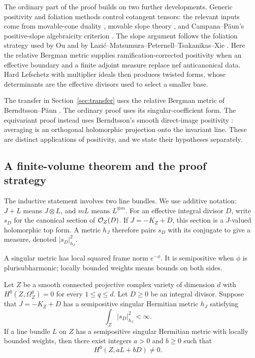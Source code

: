 The ordinary part of the proof builds on two further developments.
Generic positivity and foliation methods control cotangent tensors:
the relevant inputs come from movable-cone duality
\cite{BDPP2013}, movable slope theory \cite{GKP2016}, and
Campana--P\u aun's positive-slope algebraicity criterion
\cite[Theorem~1.1]{CampanaPaun2019}.
The slope argument follows the foliation strategy used by
Ou \cite[Theorem~1.4]{Ou2023} and by
Lazi\'c--Matsumura--Peternell--Tsakanikas--Xie
\cite[Theorem~4.1]{LMPTX2023}.
Here the relative Bergman metric supplies ramification-corrected
positivity when an effective boundary and a finite adjoint measure
replace nef anticanonical data.
Hard Lefschetz with multiplier ideals \cite[Theorem~2.1.1]{DPS2001}
then produces twisted forms, whose determinants are the effective
divisors used to select a smaller base.

The transfer in Section~\ref{sec:transfer} uses the relative Bergman metric of
Berndtsson--P\u aun \cite[Theorem~0.1]{BerndtssonPaun2008}.
The ordinary proof uses its singular-coefficient form. The equivariant
proof instead uses Berndtsson's smooth direct-image positivity
\cite[Theorem~1.2]{Berndtsson2009}: averaging is an orthogonal holomorphic
projection onto the invariant line. These are distinct applications of
positivity, and we state their hypotheses separately.

\subsection{A finite-volume theorem and the proof strategy}
\label{sec:overview}

The inductive statement involves two line bundles. We use additive
notation: $J+L$ means $J\otimes L$, and $mL$ means $L^{\otimes m}$.
For an effective integral divisor $D$, write $s_D$ for the canonical
section of $\mathcal O_Z(D)$. If $J=-K_Z+D$, this section is a $J$-valued
holomorphic top form. A metric $h_J$ therefore pairs $s_D$ with its
conjugate to give a measure, denoted $|s_D|_{h_J}^2$.

A singular metric has local squared frame norm $e^{-\phi}$. It is
semipositive when $\phi$ is plurisubharmonic; locally bounded weights
means bounds on both sides.

\begin{theorem}
\label{thm:finite-volume}
Let $Z$ be a smooth connected projective complex variety of dimension
$d$ with $H^0(Z,\Omega_Z^q)=0$ for every $1\le q\le d$.
Let $D\ge0$ be an integral divisor. Suppose that $J=-K_Z+D$ has a
semipositive singular Hermitian metric $h_J$ satisfying
\[
                 \int_Z |s_D|_{h_J}^2<\infty.
\]
If a line bundle $L$ on $Z$ has a semipositive singular Hermitian metric
with locally bounded weights, then there exist integers $a>0$ and
$b\ge0$ such that
\[
                       H^0(Z,aL+bD)\ne0.
\]
\end{theorem}

